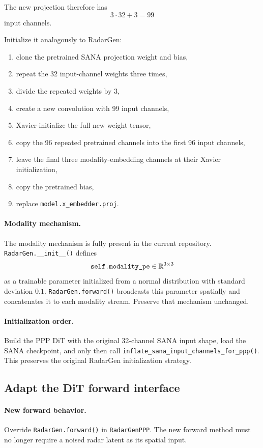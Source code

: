 \documentclass[11pt,a4paper]{article}
\begin{document}
The new projection therefore has
\[
    3\cdot32+3=99
\]
input channels.

Initialize it analogously to RadarGen:
\begin{enumerate}[label=\arabic*.]
    \item clone the pretrained SANA projection weight and bias,
    \item repeat the 32 input-channel weights three times,
    \item divide the repeated weights by \(3\),
    \item create a new convolution with 99 input channels,
    \item Xavier-initialize the full new weight tensor,
    \item copy the 96 repeated pretrained channels into the first 96 input channels,
    \item leave the final three modality-embedding channels at their Xavier initialization,
    \item copy the pretrained bias,
    \item replace \texttt{model.x\_embedder.proj}.
\end{enumerate}

\paragraph{Modality mechanism.}
The modality mechanism is fully present in the current repository. \texttt{RadarGen.\_\_init\_\_()} defines
\[
    \text{\texttt{self.modality\_pe}}
    \in\mathbb R^{3\times3}
\]
as a trainable parameter initialized from a normal distribution with standard deviation \(0.1\). \texttt{RadarGen.forward()} broadcasts this parameter spatially and concatenates it to each modality stream. Preserve that mechanism unchanged.

\paragraph{Initialization order.}
Build the PPP DiT with the original 32-channel SANA input shape, load the SANA checkpoint, and only then call \texttt{inflate\_sana\_input\_channels\_for\_ppp()}. This preserves the original RadarGen initialization strategy.

\subsection{Adapt the DiT forward interface}

\paragraph{New forward behavior.}
Override \texttt{RadarGen.forward()} in \texttt{RadarGenPPP}. The new forward method must no longer require a noised radar latent as its spatial input.
\end{document}
